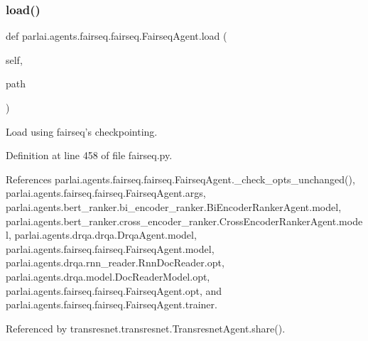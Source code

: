 \subsubsection{\texorpdfstring{load()}{load()}}
{\footnotesize\ttfamily def parlai.\+agents.\+fairseq.\+fairseq.\+Fairseq\+Agent.\+load (\begin{DoxyParamCaption}\item[{}]{self,  }\item[{}]{path }\end{DoxyParamCaption})}

\begin{DoxyVerb}Load using fairseq's checkpointing.\end{DoxyVerb}
 

Definition at line 458 of file fairseq.\+py.



References parlai.\+agents.\+fairseq.\+fairseq.\+Fairseq\+Agent.\+\_\+check\+\_\+opts\+\_\+unchanged(), parlai.\+agents.\+fairseq.\+fairseq.\+Fairseq\+Agent.\+args, parlai.\+agents.\+bert\+\_\+ranker.\+bi\+\_\+encoder\+\_\+ranker.\+Bi\+Encoder\+Ranker\+Agent.\+model, parlai.\+agents.\+bert\+\_\+ranker.\+cross\+\_\+encoder\+\_\+ranker.\+Cross\+Encoder\+Ranker\+Agent.\+model, parlai.\+agents.\+drqa.\+drqa.\+Drqa\+Agent.\+model, parlai.\+agents.\+fairseq.\+fairseq.\+Fairseq\+Agent.\+model, parlai.\+agents.\+drqa.\+rnn\+\_\+reader.\+Rnn\+Doc\+Reader.\+opt, parlai.\+agents.\+drqa.\+model.\+Doc\+Reader\+Model.\+opt, parlai.\+agents.\+fairseq.\+fairseq.\+Fairseq\+Agent.\+opt, and parlai.\+agents.\+fairseq.\+fairseq.\+Fairseq\+Agent.\+trainer.



Referenced by transresnet.\+transresnet.\+Transresnet\+Agent.\+share().


